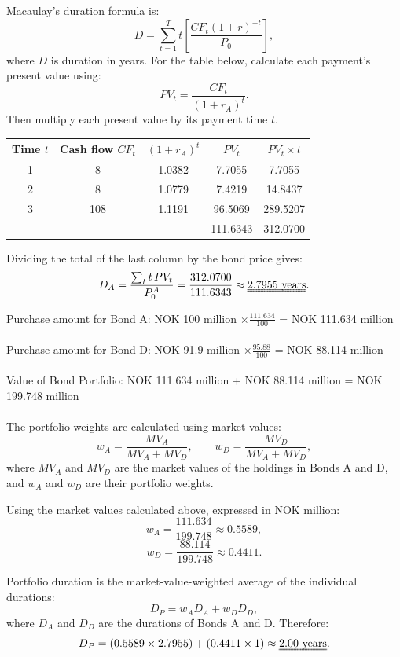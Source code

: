 \documentclass[12]{article}
\begin{document}
\par\noindent Macaulay's duration formula is:
\[
D=\sum_{t=1}^{T}t\left[\frac{CF_t(1+r)^{-t}}{P_0}\right],
\]
where $D$ is duration in years.
For the table below, calculate each payment's present value using:
\[
PV_t=\frac{CF_t}{(1+r_A)^t}.
\]
Then multiply each present value by its payment time $t$.

\begin{table}[H]
    \centering
    {\color{blue}
    \begin{tabular}{ccccc}
    \toprule
    Time $t$ & Cash flow $CF_t$ & $(1+r_A)^t$ & $PV_t$ & $PV_t\times t$\\
    \midrule
    1 & 8   & 1.0382 & 7.7055  & 7.7055\\
    2 & 8   & 1.0779 & 7.4219  & 14.8437\\
    3 & 108 & 1.1191 & 96.5069 & 289.5207\\
    \midrule
      &     &        & 111.6343 & 312.0700\\
    \bottomrule
    \end{tabular}}
\end{table}

\noindent Dividing the total of the last column by the bond price gives:
\[
D_A=\frac{\sum_t t\,PV_t}{P_0^A}
=\frac{312.0700}{111.6343}
\approx\text{\uuline{2.7955 years}}.
\]

\noindent
Purchase amount for Bond A: NOK 100 million $\times \frac{111.634}{100}$ = NOK 111.634 million\\
\\
Purchase amount for Bond D: NOK 91.9 million $\times \frac{95.88}{100}$ = NOK 88.114 million\\
\\
Value of Bond Portfolio: NOK 111.634 million + NOK 88.114 million = NOK 199.748 million\\
\\
\noindent The portfolio weights are calculated using market values:
\[
w_A=\frac{MV_A}{MV_A+MV_D},
\qquad
w_D=\frac{MV_D}{MV_A+MV_D},
\]
where $MV_A$ and $MV_D$ are the market values of the holdings in Bonds A and D, and $w_A$ and $w_D$ are their portfolio weights.

\par\noindent Using the market values calculated above, expressed in NOK million:
\[
w_A=\frac{111.634}{199.748}\approx0.5589,
\]
\[
w_D=\frac{88.114}{199.748}\approx0.4411.
\]

\par\noindent Portfolio duration is the market-value-weighted average of the individual durations:
\[
D_P=w_A D_A+w_D D_D,
\]
where $D_A$ and $D_D$ are the durations of Bonds A and D.
Therefore:
\[
D_P=(0.5589\times2.7955)+(0.4411\times1)
\approx\text{\uuline{2.00 years}}.
\]
\end{document}
